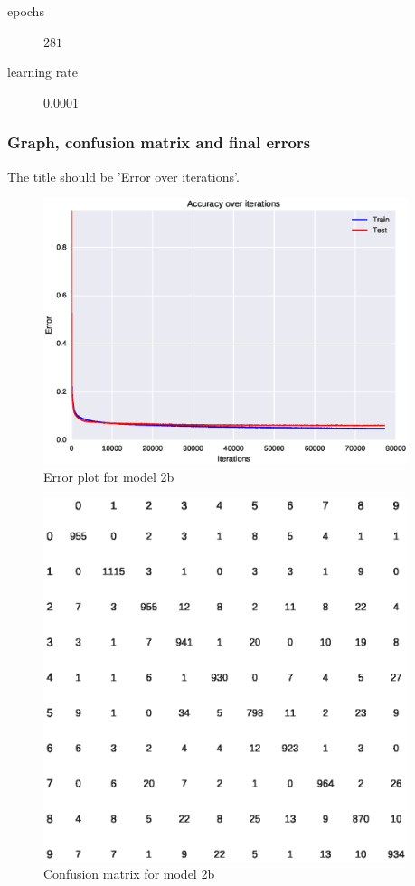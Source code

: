 \documentclass{article}
\begin{document}
\begin{description}
\item[epochs] $281$
\item[learning rate] $0.0001$
\end{description}

\subsubsection{Graph, confusion matrix and final errors}

The title should be 'Error over iterations'.

\begin{figure}[H]
  \centering
  \includegraphics[width=0.95\textwidth]{error_model_2b.eps}
  \caption{Error plot for model 2b}
  \label{fig:err_2b}
\end{figure}

\begin{figure}[H]
  \centering
  \includegraphics[width=0.95\textwidth]{model_2b_confusion_matrix.eps}
  \caption{Confusion matrix for model 2b}
  \label{fig:conf_2b}
\end{figure}
\end{document}
